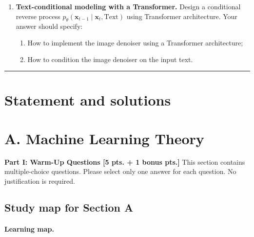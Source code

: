\documentclass[11pt,a4paper]{article}
\DeclareMathOperator{\E}{\mathbb{E}}
\begin{document}
\begin{enumerate}[label=(\alph*)]
\begin{enumerate}[label=(\roman*)]
        \item Prove that, up to constant and per-timestep weights, training reduces to
        \[
        \mathcal{L}_t = \E_{t, \mathbf{x}_0, \boldsymbol{\epsilon}} \Bigl[ \bigl\| \boldsymbol{\epsilon} - \boldsymbol{\epsilon}_{\theta}\bigl(\sqrt{\bar{\alpha}_t}\, \mathbf{x}_0 + \sqrt{1 - \bar{\alpha}_t}\, \boldsymbol{\epsilon},\, t\bigr) \bigr\|_{2}^{2} \Bigr],
        \]
        where $\boldsymbol{\epsilon} \sim \mathcal{N}(\mathbf{0}, \mathbf{I})$ and $t$ is sampled from a specified distribution over $\{1, \dots, T\}$.
    \end{enumerate}
    \item \textbf{Text-conditional modeling with a Transformer.} Design a conditional reverse process $p_{\theta}(\mathbf{x}_{t-1} \mid \mathbf{x}_t, \mathrm{Text})$ using Transformer architecture. Your answer should specify:
    \begin{enumerate}[label=(\roman*)]
        \item How to implement the image denoiser using a Transformer architecture;
        \item How to condition the image denoiser on the input text.
    \end{enumerate}
\end{enumerate}

\noindent\rule{\linewidth}{0.4pt}

\section{Statement and solutions}

\section{A. Machine Learning Theory}

\noindent\textbf{Part I: Warm-Up Questions [5 pts. + 1 bonus pts.]}
This section contains multiple-choice questions. Please select only one answer for each question. No justification is required.


\subsection{Study map for Section A}

\paragraph{Learning map.}
\end{document}
